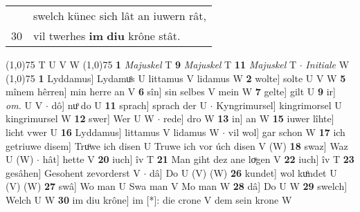 \documentclass[8pt,a4paper,notitlepage]{article}
\begin{document}
\begin{table}[ht]
\begin{minipage}[t]{0.5\linewidth}
\begin{tabular}{rl}
 & swelch künec sich lât an iuwern rât,\\ 
30 & vil twerhes \textbf{im} \textbf{diu} krône stât.\\ 
\end{tabular}
\scriptsize
\line(1,0){75} \newline
T U V W \newline
\line(1,0){75} \newline
\textbf{1} \textit{Majuskel} T  \textbf{9} \textit{Majuskel} T  \textbf{11} \textit{Majuskel} T   $\cdot$ \textit{Initiale} W  \newline
\line(1,0){75} \newline
\textbf{1} Lyddamus] Lydamuͦs U littamus V lidamus W \textbf{2} wolte] solte U V W \textbf{5} mînem hêrren] min herre an V \textbf{6} sîn] sin selbes V mein W \textbf{7} gelte] gilt U \textbf{9} ir] \textit{om.} U V  $\cdot$ dô] nuͦ do U \textbf{11} sprach] sprach der U  $\cdot$ Kyngrimursel] kingrimorsel U kingrimursel W \textbf{12} swer] Wer U W  $\cdot$ rede] dro W \textbf{13} in] an W \textbf{15} iuwer lîhte] licht vwer U \textbf{16} Lyddamus] littamus V lidamus W  $\cdot$ vil wol] gar schon W \textbf{17} ich getriuwe disem] Truͦwe ich disen U Truwe ich vor úch disen V (W) \textbf{18} swaz] Waz U (W)  $\cdot$ hât] hette V \textbf{20} iuch] îv T \textbf{21} Man giht dez ane loͮgen V \textbf{22} iuch] îv T \textbf{23} gesâhen] Gesohent zevorderst V  $\cdot$ dâ] Do U (V) (W) \textbf{26} kundet] wol kuͦndet U (V) (W) \textbf{27} swâ] Wo man U Swa man V Mo man W \textbf{28} dâ] Do U W \textbf{29} swelch] Welch U W \textbf{30} im diu krône] im [*]: die crone V dem sein krone W \newline
\end{minipage}
\end{table}
\end{document}
